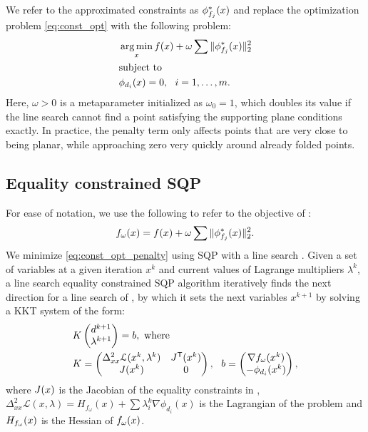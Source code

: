 We refer to the approximated constraints as $\phi^*_{f_j}(x)$ and replace the optimization problem \eqref{eq:const_opt} with the following problem:
\begin{equation} \label{eq:const_opt_penalty}
\begin{aligned}
& \operatorname*{arg\,min}_x f(x) + \omega \sum \|\phi^*_{f_j}(x)\|_2^2 \\
& \textrm{subject to} \\
& \phi_{d_i}(x) = 0, \ \  i = 1, \ldots, m. \\ 
\end{aligned}
\end{equation}
Here, $\omega > 0$ is a metaparameter initialized as $\omega_0 = 1$, which doubles its value if the line search cannot find a point satisfying the supporting plane conditions exactly. In practice, the penalty term only affects points that are very close to being planar, while approaching zero very quickly around already folded points.

\subsection{Equality constrained SQP}
For ease of notation, we use the following to refer to the objective of :
\begin{equation}
f_\omega(x) = f(x) + \omega \sum \|\phi^*_{f_j}(x)\|_2^2.
\end{equation}
We minimize \eqref{eq:const_opt_penalty} using SQP with a line search \cite{nocedal}. Given a set of variables at a given iteration $x^k$ and current values of Lagrange multipliers $\lambda^k$, a line search equality constrained SQP algorithm iteratively finds the next direction for a line search of , by which it sets the next variables $x^{k+1}$ by solving a KKT system of the form:
%
\begin{equation} \label{eq:KKT_eps}
\begin{aligned}
&{K} \begin{pmatrix} d^{k+1} \\ \lambda^{k+1} \end{pmatrix}={b}, \ \text{where} \\
&{K}=\begin{pmatrix}
{\Delta^2_{xx}\mathcal{L}(x^k,\lambda^k)} & {J^\tr}(\x^k)\\
{J(\x^k)} &  0 \\
\end{pmatrix}, \ \ 
{b}=\begin{pmatrix}
{\nabla f_\omega(x^k)} \\ 
-\phi_{d_i}(x^k)\\
\end{pmatrix},
\end{aligned}
\end{equation}
%
where $J(x)$ is the Jacobian of the equality constraints in , $\Delta^2_{xx}\mathcal{L}(x,\lambda) = H_{f_\omega}(x)+\sum\lambda_i^{k} \nabla \phi_{d_i}(x)$ is the Lagrangian of the problem and $H_{f_\omega}(x)$ is the Hessian of $f_\omega(x)$.

